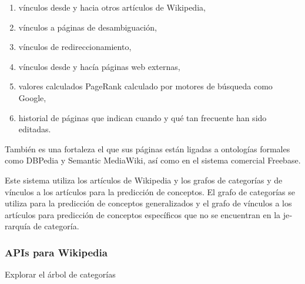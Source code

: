 \documentclass[letterpaper]{article}
\newcommand\textstylebibuscitbase[1]{#1}
\newcommand\liststyleWWviiiNumviii{%
\renewcommand\theenumi{\arabic{enumi}}
\renewcommand\theenumii{\arabic{enumii}}
\renewcommand\theenumiii{\arabic{enumiii}}
\renewcommand\theenumiv{\arabic{enumiv}}
\renewcommand\labelenumi{\theenumi.}
\renewcommand\labelenumii{\theenumii.}
\renewcommand\labelenumiii{\theenumiii.}
\renewcommand\labelenumiv{\theenumiv.}
}
\begin{document}
\liststyleWWviiiNumviii
\begin{enumerate}
\item {\sffamily
\textstylebibuscitbase{\foreignlanguage{spanish}{v\'inculos desde y
hacia otros art\'iculos de Wikipedia,}}}
\item {\sffamily
\textstylebibuscitbase{\foreignlanguage{spanish}{v\'inculos a p\'aginas
de desambiguaci\'on,}}}
\item {\sffamily
\textstylebibuscitbase{\foreignlanguage{spanish}{v\'inculos de
redireccionamiento,}}}
\item {\sffamily
\textstylebibuscitbase{\foreignlanguage{spanish}{v\'inculos desde y
hac\'ia p\'aginas web externas,}}}
\item {\sffamily
\textstylebibuscitbase{\foreignlanguage{spanish}{valores calculados
PageRank calculado por motores de b\'usqueda como Google,}}}
\item {\sffamily
\textstylebibuscitbase{\foreignlanguage{spanish}{historial de p\'aginas
que indican cuando y qu\'e tan frecuente han sido editadas.}}}
\end{enumerate}
{\sffamily
\textstylebibuscitbase{\foreignlanguage{spanish}{Tambi\'en es una
fortaleza el que sus p\'aginas est\'an ligadas a ontolog\'ias formales
como DBPedia y Semantic MediaWiki, as\'i como en el sistema comercial
Freebase.}}}


\bigskip

{\sffamily
\textstylebibuscitbase{\foreignlanguage{spanish}{Este sistema utiliza
los art\'iculos de Wikipedia y los grafos de categor\'ias y de
}}\textstylebibuscitbase{\foreignlanguage{spanish}{v\'inculos a los
art\'iculos para la predicci\'on de conceptos. El grafo de categor\'ias
se utiliza para la predicci\'on de conceptos generalizados y el grafo
de v\'inculos a los art\'iculos para predicci\'on de conceptos
espec\'ificos que no se encuentran en la jerarqu\'ia de categor\'ia.}}}


\bigskip

\subsubsection[APIs para Wikipedia]{APIs para Wikipedia}
\hypertarget{RefHeading10800782078703}{}
\bigskip

{\sffamily
Explorar el \'arbol de categor\'ias}
\end{document}

